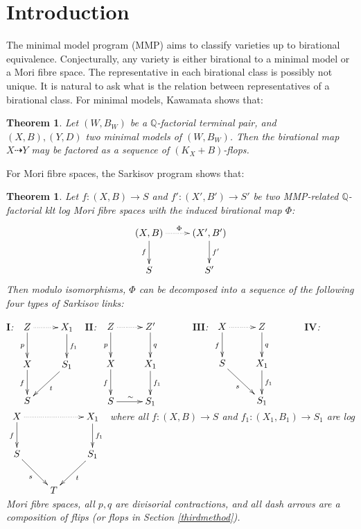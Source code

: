 \documentclass[11pt]{amsart}
\newtheorem{thm}[defn]{Theorem}
\begin{document}
\section{Introduction}
The minimal model program (MMP)  aims to classify varieties up to birational equivalence.
Conjecturally, any variety is either birational to a minimal model or a Mori fibre space. The representative in each birational class is possibly not unique. It is natural to ask what is the relation between representatives of a birational class. 
For minimal models, Kawamata shows that:
\begin{thm}
\cite[Theorem 1]{kawamataFlopsConnectMinimal2008} Let $(W,B_W)$ be a $\mathbb{Q}$-factorial terminal pair, and $(X,B),(Y,D)$  two minimal models of $(W,B_W)$. Then the birational map $X\dashrightarrow Y$ may be factored as a sequence of $(K_X+B)$-flops.
\end{thm}
For Mori fibre spaces, the Sarkisov program shows that:
\begin{thm}\label{main}
  Let $ f:(X, B)\to S$ and $f':(X', B')\to S' $ be two MMP-related $ \mathbb{Q} $-factorial klt log Mori fibre spaces with the induced  birational map $\Phi$:
  \[
    \xymatrix{
      (X,B)\ar[d]_f\ar@{.>}[r]^\Phi&(X',B')\ar[d]^{f'}\\
      S&S'}
  \]
  Then modulo isomorphisms, $ \Phi  $ can be decomposed into a sequence of the following four types of Sarkisov links:


  $\textbf{I}$:
  $\xymatrix{
      Z\ar[d]_p\ar@{.>}[r]&X_1\ar[d]^{f_1}\\
      X\ar[d]_f&S_1\ar[dl]^{t}\\
      S &}$
  $\textbf{II}$:
  $\xymatrix{
      Z\ar[d]_p\ar@{.>}[r]&Z'\ar[d]^{q}&\\
      X\ar[d]_{f}&X_1\ar[d]^{f_1}\\
      S\ar[r]^{\sim}&S_1}$
  $\textbf{III}$:
  $
    \xymatrix{
    X\ar@{.>}[r]\ar[d]_f& Z\ar[d]^q& \\
    S\ar[rd]_{s}         & X_{1}\ar[d]^{f_{1}}&\\
    &S_{1}
    }
  $
  $\textbf{IV}$:
  $\xymatrix{
      X\ar[d]_f\ar@{.>}[rr]&&X_1\ar[d]^{f_1}\\
      S\ar[dr]_{s}&&S_1\ar[dl]^{t}\\
      &T &}$
  where all $ f:(X, B)\to S $ and $ f_1:(X_1, B_1)\to S_1 $ are log Mori fibre spaces, all $ p,q $ are divisorial contractions, and all dash arrows are a composition of flips (or flops in Section \ref{thirdmethod}).
\end{thm}
\end{document}
